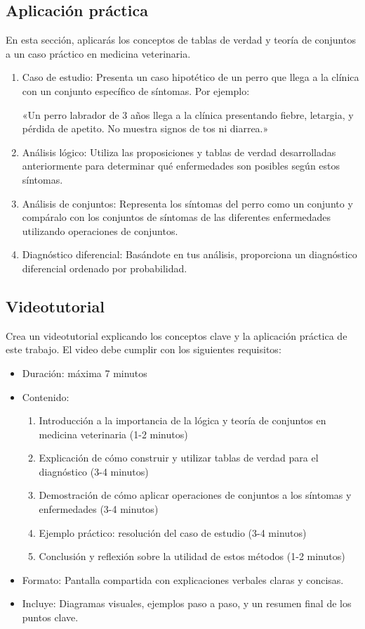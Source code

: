 \documentclass[a4,11pt]{aleph-notas}
\begin{document}
\subsection{Aplicación práctica}
En esta sección, aplicarás los conceptos de tablas de verdad y teoría de conjuntos a un caso práctico en medicina veterinaria.

\begin{enumerate}
    \item Caso de estudio: Presenta un caso hipotético de un perro que llega a la clínica con un conjunto específico de síntomas. Por ejemplo:
    
    «Un perro labrador de 3 años llega a la clínica presentando fiebre, letargia, y pérdida de apetito. No muestra signos de tos ni diarrea.»

    \item Análisis lógico: Utiliza las proposiciones y tablas de verdad desarrolladas anteriormente para determinar qué enfermedades son posibles según estos síntomas.

    \item Análisis de conjuntos: Representa los síntomas del perro como un conjunto y compáralo con los conjuntos de síntomas de las diferentes enfermedades utilizando operaciones de conjuntos.

    \item Diagnóstico diferencial: Basándote en tus análisis, proporciona un diagnóstico diferencial ordenado por probabilidad.
\end{enumerate}

\subsection{Videotutorial}
Crea un videotutorial explicando los conceptos clave y la aplicación práctica de este trabajo. El video debe cumplir con los siguientes requisitos:

\begin{itemize}
    \item Duración: máxima 7 minutos
    \item Contenido:
    \begin{enumerate}
        \item Introducción a la importancia de la lógica y teoría de conjuntos en medicina veterinaria (1-2 minutos)
        \item Explicación de cómo construir y utilizar tablas de verdad para el diagnóstico (3-4 minutos)
        \item Demostración de cómo aplicar operaciones de conjuntos a los síntomas y enfermedades (3-4 minutos)
        \item Ejemplo práctico: resolución del caso de estudio (3-4 minutos)
        \item Conclusión y reflexión sobre la utilidad de estos métodos (1-2 minutos)
    \end{enumerate}
    \item Formato: Pantalla compartida con explicaciones verbales claras y concisas.
    \item Incluye: Diagramas visuales, ejemplos paso a paso, y un resumen final de los puntos clave.
\end{itemize}
\end{document}
